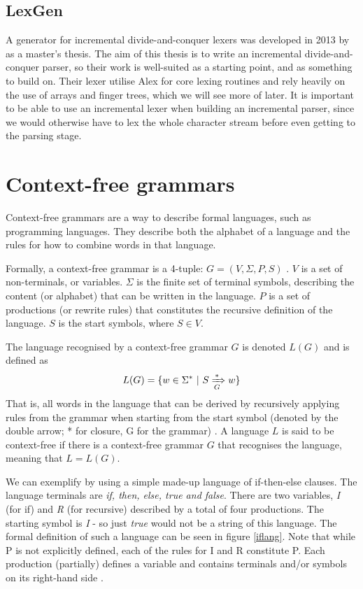 \documentclass[a4paper,12pt,twosided]{report}
\renewcommand\cite{\citep}
\begin{document}
\subsection{LexGen}
A generator for incremental divide-and-conquer lexers was developed in 2013 by
\citet{divconqlex} as a master's thesis. The aim of this thesis is to write an
incremental divide-and-conquer parser, so their work is well-suited as a
starting point, and as something to build on. Their lexer utilise Alex for core
lexing routines and rely heavily on the use of arrays and finger trees, which
we will see more of later. It is important to be able to use an incremental
lexer when building an incremental parser, since we would otherwise have to lex
the whole character stream before even getting to the parsing stage.

\section{Context-free grammars}
Context-free grammars are a way to describe formal languages, such as
programming languages. They describe both the alphabet of a language and the
rules for how to combine words in that language.

Formally, a context-free grammar is a 4-tuple: $G = (V, \Sigma, P, S)$
\cite[p.171]{automatabook}. $V$ is a set of non-terminals, or variables. $\Sigma$ is
the finite set of terminal symbols, describing the content (or alphabet) that
can be written in the language. $P$ is a set of productions (or rewrite rules)
that constitutes the recursive definition of the language. $S$ is the start
symbols, where $S \in V$. 

The language recognised by a context-free grammar $G$ is denoted $L(G)$ and is
defined as 
\[
L(G) = \{w \in \Sigma^* \ |\  S \xRightarrow[G]{*} w\}
\]
That is, all words in the language that can be derived by recursively applying
rules from the grammar when starting from the start symbol (denoted by the
double arrow; * for closure, G for the grammar) \cite[p.  177]{automatabook}. A
language $L$ is said to be context-free if there is a context-free grammar $G$
that recognises the language, meaning that $L = L(G)$.

We can exemplify by using a simple made-up language of if-then-else clauses.
The language terminals are \textit{if, then, else, true and false}.
There are two variables, \textit{I} (for if) and \textit{R} (for recursive)
described by a total of four productions. The starting symbol is \textit{I} - so
just \textit{true} would not be a string of this language. The formal
definition of such a language can be seen in figure \ref{iflang}. Note that
while P is not explicitly defined, each of the rules for I and R constitute P.
Each production (partially) defines a variable and contains terminals and/or
symbols on its right-hand side \cite[p.171]{automatabook}.
\end{document}
